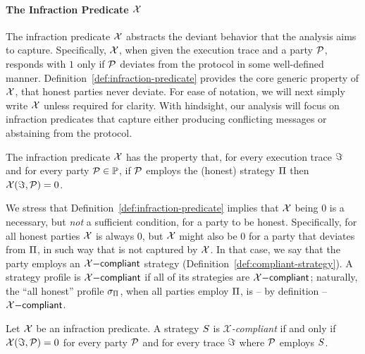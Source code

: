 \paragraph{The Infraction Predicate $\mathcal{X}$}
The infraction predicate $\mathcal{X}$ abstracts the
deviant behavior that the analysis aims to capture. Specifically,
$\mathcal{X}$, when given the execution trace and a party $\mathcal{P}$,
responds with $1$ only if $\mathcal{P}$ deviates from the protocol in some
well-defined manner. Definition~\ref{def:infraction-predicate} provides the
core generic property of $\mathcal{X}$, \ie that honest
parties never deviate. For ease of notation, we will next simply write $\mathcal{X}$ unless required for clarity.
With hindsight, our analysis will
focus on infraction predicates that capture either producing conflicting
messages or abstaining from the protocol.

\begin{definition}\label{def:infraction-predicate}
    The infraction predicate $\mathcal{X}$ has the property that, for
    every execution trace $\Im$ and for every party $\mathcal{P} \in
    \mathbb{P}$, if $\mathcal{P}$ employs the (honest) strategy $\Pi$ then
    $\mathcal{X}(\Im, \mathcal{P}) = 0$.
\end{definition}

We stress that Definition~\ref{def:infraction-predicate} implies that
$\mathcal{X}$ being $0$ is a necessary, but \emph{not} a sufficient
condition, for a party to be honest. Specifically, for all honest parties
$\mathcal{X}$ is always $0$, but $\mathcal{X}$ might
also be $0$ for a party that deviates from $\Pi$, in such way that is not
captured by $\mathcal{X}$. In that case, we say that the party employs
an $\mathcal{X}\mathsf{-compliant}$ strategy (Definition~\ref{def:compliant-strategy}). A strategy
profile is $\mathcal{X}\mathsf{-compliant}$ if all of its strategies are $\mathcal{X}\mathsf{-compliant}$; naturally,
the ``all honest'' profile $\sigma_\Pi$, \ie when all parties employ
$\Pi$, is -- by definition -- $\mathcal{X}\mathsf{-compliant}$.

\begin{definition}\label{def:compliant-strategy}
    Let $\mathcal{X}$ be an infraction predicate. A strategy $S$ is
    \emph{$\mathcal{X}$-compliant} if and only if $\mathcal{X}(\Im, \mathcal{P}) =
    0$ for every party $\mathcal{P}$ and for every trace $\Im$ where $\mathcal{P}$ employs $S$.
\end{definition}

